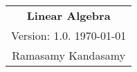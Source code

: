 



\raggedright
\footnotesize
\begin{multicols*}{3}
\setlength{\premulticols}{1pt}
\setlength{\postmulticols}{1pt}
\setlength{\multicolsep}{1pt}
\setlength{\columnsep}{2pt}


\begin{center}
\begin{tabular}{c}
\LARGE{\textbf{Linear Algebra}}\\
Version: 1.0. \today \\
Ramasamy Kandasamy\\
\end{tabular}
\end{center}










\vfill\null
\newcolumn






\end{multicols*}

